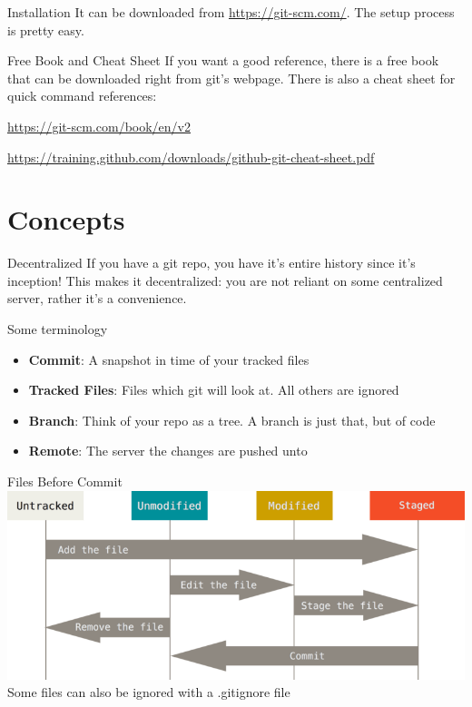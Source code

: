 \begin{frame}{Installation}
    It can be downloaded from \url{https://git-scm.com/}. The setup process is pretty easy.
\end{frame}

\begin{frame}{Free Book and Cheat Sheet}
    If you want a good reference, there is a free book that can be downloaded right from git's webpage. There is also a cheat sheet for quick command references:

    \url{https://git-scm.com/book/en/v2}

    \url{https://training.github.com/downloads/github-git-cheat-sheet.pdf}
\end{frame}

\section{Concepts}

\begin{frame}{Decentralized}
    If you have a git repo, you have it's entire history since it's inception!
    This makes it decentralized: you are not reliant on some centralized server, rather it's a convenience.
\end{frame}

\begin{frame}{Some terminology}
    \begin{itemize}
        \item \textbf{Commit}: A snapshot in time of your tracked files
        \item \textbf{Tracked Files}: Files which git will look at. All others are ignored
        \item \textbf{Branch}: Think of your repo as a tree. A branch is just that, but of code
        \item \textbf{Remote}: The server the changes are pushed unto
    \end{itemize}
\end{frame}

\begin{frame}{Files Before Commit}
    \includegraphics[width=\textwidth]{eimg/lifecycle.png}
    Some files can also be ignored with a .gitignore file
\end{frame}

